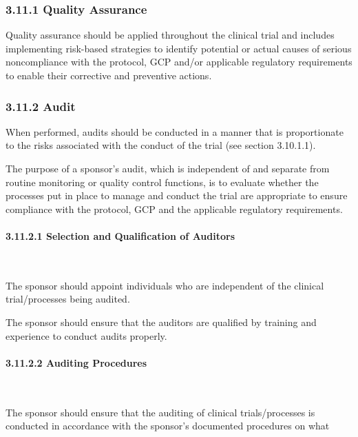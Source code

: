 \documentclass[11pt]{article}
\begin{document}
\subsubsection{3.11.1 Quality Assurance}

Quality assurance should be applied throughout the clinical trial and includes implementing risk-based strategies to identify potential or actual causes of serious noncompliance with the protocol, GCP and/or applicable regulatory requirements to enable their corrective and preventive actions.


\subsubsection{3.11.2 Audit}

When performed, audits should be conducted in a manner that is proportionate to the risks associated with the conduct of the trial (see section 3.10.1.1).


The purpose of a sponsor's audit, which is independent of and separate from routine monitoring or quality control functions, is to evaluate whether the processes put in place to manage and conduct the trial are appropriate to ensure compliance with the protocol, GCP and the applicable regulatory requirements.


\paragraph{3.11.2.1 Selection and Qualification of Auditors}\mbox{}\\

\begin{description}[leftmargin=2.5cm,style=sameline]

\item[(a)] The sponsor should appoint individuals who are independent of the clinical trial/processes being audited.

\item[(b)] The sponsor should ensure that the auditors are qualified by training and experience to conduct audits properly.

\end{description}

\paragraph{3.11.2.2 Auditing Procedures}\mbox{}\\

\begin{description}[leftmargin=2.5cm,style=sameline]

\item[(a)] The sponsor should ensure that the auditing of clinical trials/processes is conducted in accordance with the sponsor's documented procedures on what

\end{description}
\end{document}
